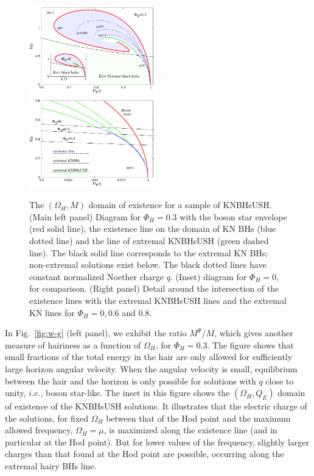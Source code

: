 \documentclass{article}
\begin{document}
\begin{figure}[h!]
  \begin{center}
    \includegraphics[width=0.497\textwidth]{BH-w-M}
     \includegraphics[width=0.497\textwidth]{zoom-w-M}
  \end{center}
  \caption{The $(\Omega_H,M)$ domain of existence for a sample of KNBHsUSH. (Main left panel) Diagram for $\Phi_H=0.3$ with the boson star envelope (red solid line), the existence line on the domain of KN BHs (blue dotted line) and the line of extremal KNBHsUSH (green dashed line). The black solid line corresponds to the extremal KN BHs; non-extremal solutions exist below. The black dotted lines have constant normalized Noether charge $q$. (Inset) diagram for $\Phi_H=0$, for comparison. (Right panel) Detail around the intersection of the existence lines with the extremal KNBHsUSH lines and the extremal KN lines for $\Phi_H=0,0.6$ and $0.8$.  
	}
  \label{fig:w-M}
\end{figure}
 
  
 In Fig.~\ref{fig:w-g} (left panel), we exhibit the ratio $ M^{\Psi}/M$, which gives another measure of hairiness
   as a function of $\Omega_H$,
for $\Phi_H=0.3$. The figure shows that small fractions of the total energy in the hair are only allowed for sufficiently large horizon angular velocity. When the angular velocity is small, equilibrium between the hair and the horizon is only possible for solutions with $q$ close to unity, $i.e.$, boson star-like. 
The inset in this figure shows the $(\Omega_H,Q_E)$ domain of existence of the KNBHsUSH solutions. It illustrates that the electric charge of the solutions, for fixed $\Omega_H$ between that of the Hod point and the maximum allowed frequency, $\Omega_H=\mu$, is maximized along the existence line (and in particular at the Hod point). But for lower values of the frequency, slightly larger charges than that found at the Hod point are possible, occurring along the extremal hairy BHs line.
\end{document}
